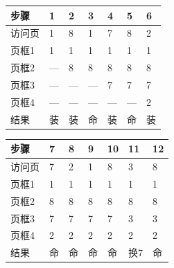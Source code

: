 \begin{wideblock}\par\medskip\noindent\begin{minipage}{\linewidth}\fontsize{9.3}{12}\selectfont\begin{tabularx}{\linewidth}{@{}YYYYYYY@{}}
\toprule\noalign{}
步骤 & 1 & 2 & 3 & 4 & 5 & 6 \\
\midrule\noalign{}


访问页 & 1 & 8 & 1 & 7 & 8 & 2 \\
页框1 & 1 & 1 & 1 & 1 & 1 & 1 \\
页框2 & --- & 8 & 8 & 8 & 8 & 8 \\
页框3 & --- & --- & --- & 7 & 7 & 7 \\
页框4 & --- & --- & --- & --- & --- & 2 \\
结果 & 装 & 装 & 命 & 装 & 命 & 装 \\
\bottomrule\end{tabularx}
\end{minipage}\par\medskip\end{wideblock}

\begin{wideblock}\par\medskip\noindent\begin{minipage}{\linewidth}\fontsize{9.3}{12}\selectfont\begin{tabularx}{\linewidth}{@{}YYYYYYY@{}}
\toprule\noalign{}
步骤 & 7 & 8 & 9 & 10 & 11 & 12 \\
\midrule\noalign{}


访问页 & 7 & 2 & 1 & 8 & 3 & 8 \\
页框1 & 1 & 1 & 1 & 1 & 1 & 1 \\
页框2 & 8 & 8 & 8 & 8 & 8 & 8 \\
页框3 & 7 & 7 & 7 & 7 & 3 & 3 \\
页框4 & 2 & 2 & 2 & 2 & 2 & 2 \\
结果 & 命 & 命 & 命 & 命 & 换7 & 命 \\
\bottomrule\end{tabularx}
\end{minipage}\par\medskip\end{wideblock}

